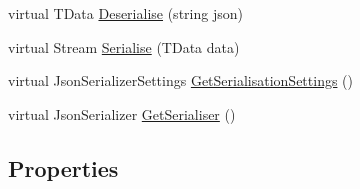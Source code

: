 \begin{DoxyCompactItemize}
virtual T\+Data \hyperlink{classCqrs_1_1Azure_1_1BlobStorage_1_1StorageStore_adea25452991418693ed966797581f67f}{Deserialise} (string json)
\item 
virtual Stream \hyperlink{classCqrs_1_1Azure_1_1BlobStorage_1_1StorageStore_a8e5d4e50e054d963f96aaa4808794718}{Serialise} (T\+Data data)
\item 
virtual Json\+Serializer\+Settings \hyperlink{classCqrs_1_1Azure_1_1BlobStorage_1_1StorageStore_a9ded88f1b48cf61b3be826fb0997adfb}{Get\+Serialisation\+Settings} ()
\item 
virtual Json\+Serializer \hyperlink{classCqrs_1_1Azure_1_1BlobStorage_1_1StorageStore_acca953271229a19433db9c38c85b5b9e}{Get\+Serialiser} ()
\end{DoxyCompactItemize}
\subsection*{Properties}
